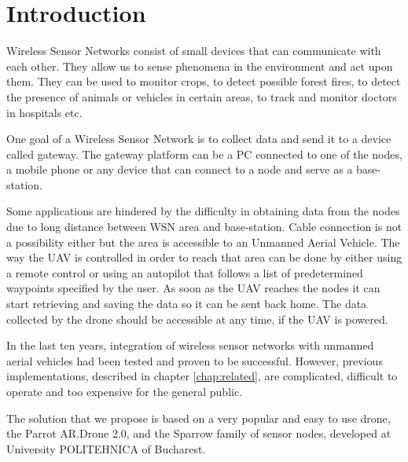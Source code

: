 \normalfont\normalsize
\chapter{Introduction}
 
Wireless Sensor Networks consist of small devices that can communicate with each other. They allow us to sense phenomena in the environment and act upon them. They can be used to monitor crops, to detect possible forest fires, to detect the presence of animals or vehicles in certain areas, to track and monitor doctors in hospitals etc.\cite{baggio2005wireless} 

One goal of a Wireless Sensor Network is to collect data and send it to a device called gateway. The gateway platform can be a PC connected to one of the nodes, a mobile phone or any device that can connect to a node and serve as a base-station.


Some applications are hindered by the difficulty in obtaining data from the nodes due to long distance between WSN area and base-station. Cable connection is not a possibility either but the area is accessible to an Unmanned Aerial Vehicle. The way the UAV is controlled in order to reach that area can be done by either using a remote control or using an autopilot that follows a list of predetermined waypoints specified by the user. As soon as the UAV reaches the nodes it can start retrieving and saving the data so it can be sent back home. The data collected by the drone should be accessible at any time, if the UAV is powered.
 
In the last ten years, integration of wireless sensor networks with unmanned aerial vehicles had been tested and proven to be successful. However, previous implementations, described in chapter \ref{chap:related}, are complicated, difficult to operate and too expensive for the general public.

The solution that we propose is based on a very popular and easy to use drone, the Parrot AR.Drone 2.0, and the Sparrow family \cite{voinescu2013lightweight} of sensor nodes, developed at University POLITEHNICA of Bucharest.
